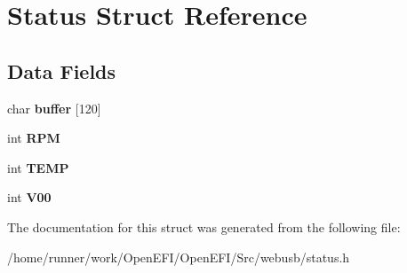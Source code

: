 \hypertarget{structStatus}{}\section{Status Struct Reference}
\label{structStatus}
\subsection*{Data Fields}
\begin{DoxyCompactItemize}
\item 
\mbox{\label{structStatus_a2efbdecd27aed3ea6740b71d9a24952b}} 
char {\bfseries buffer} \mbox{[}120\mbox{]}
\item 
\mbox{\label{structStatus_aa99fe6e7f4743cf3579c28864e7ccc3d}} 
int {\bfseries R\+PM}
\item 
\mbox{\label{structStatus_abb4de386a3cea528524287d78e55184d}} 
int {\bfseries T\+E\+MP}
\item 
\mbox{\label{structStatus_a6dae3728c5396095da6c2c170708a741}} 
int {\bfseries V00}
\end{DoxyCompactItemize}


The documentation for this struct was generated from the following file\+:\begin{DoxyCompactItemize}
\item 
/home/runner/work/\+Open\+E\+F\+I/\+Open\+E\+F\+I/\+Src/webusb/status.\+h\end{DoxyCompactItemize}
